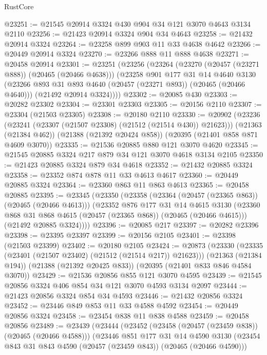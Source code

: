 \begin{lexlean}{RustCore}
\begin{coremodule}
@23251 := @21545 @20914 @3324 @430 @904 @34 @121 @3070 @4643 @3134 @2110
@23256 := @21423 @20914 @3324 @904 @34 @4643
@23258 := @21432 @20914 @3324
@23264 := @23258 @899 @903 @11 @33 @4638 @4642
@23266 := @20449 @20914 @3324
@23270 := @23266 @888 @11 @888 @4638
@23271 := @20458 @20914
@23301 := @23251
    (@23256
      (@23264
        (@23270 (@20457 (@23271 @888)) (@20465 (@20466 @4638)))
        (@23258
          @901
          @177
          @31
          @14
          @4640
          @3130
          (@23266 @893 @31 @893 @4640 (@20457 (@23271 @893)) (@20465 (@20466 @4640)))
          (@21492 @20914 @3324))))
@23302 := @20085 @430
@23303 := @20282 @23302
@23304 := @23301 @23303
@23305 := @20156 @2110
@23307 := @23304 (@21503 @23305)
@23308 := @20180 @2110
@23330 := @20902
    (@23236 (@23241 (@23307 (@21507 @23308) (@21512 (@21514 @430)) @21623)))
    (@21363 (@21384 @462))
    (@21388 (@21392 @20424 @858))
    (@20395 (@21401 @858 @871 @4609 @3070))
@23335 := @21536 @20885 @880 @121 @3070 @4620
@23345 := @21545 @20885 @3324 @217 @879 @34 @121 @3070 @4618 @3134 @2105
@23350 := @21423 @20885 @3324 @879 @34 @4618
@23352 := @21432 @20885 @3324
@23358 := @23352 @874 @878 @11 @33 @4613 @4617
@23360 := @20449 @20885 @3324
@23364 := @23360 @863 @11 @863 @4613
@23365 := @20458 @20885
@23395 := @23345
    (@23350
      (@23358
        (@23364 (@20457 (@23365 @863)) (@20465 (@20466 @4613)))
        (@23352
          @876
          @177
          @31
          @14
          @4615
          @3130
          (@23360 @868 @31 @868 @4615 (@20457 (@23365 @868)) (@20465 (@20466 @4615)))
          (@21492 @20885 @3324))))
@23396 := @20085 @217
@23397 := @20282 @23396
@23398 := @23395 @23397
@23399 := @20156 @2105
@23401 := @23398 (@21503 @23399)
@23402 := @20180 @2105
@23424 := @20873
    (@23330 (@23335 (@23401 (@21507 @23402) (@21512 (@21514 @217)) @21623)))
    (@21363 (@21384 @194))
    (@21388 (@21392 @20425 @833))
    (@20395 (@21401 @833 @846 @4584 @3070))
@23429 := @21536 @20856 @855 @121 @3070 @4595
@23439 := @21545 @20856 @3324 @406 @854 @34 @121 @3070 @4593 @3134 @2097
@23444 := @21423 @20856 @3324 @854 @34 @4593
@23446 := @21432 @20856 @3324
@23452 := @23446 @849 @853 @11 @33 @4588 @4592
@23454 := @20449 @20856 @3324
@23458 := @23454 @838 @11 @838 @4588
@23459 := @20458 @20856
@23489 := @23439
    (@23444
      (@23452
        (@23458 (@20457 (@23459 @838)) (@20465 (@20466 @4588)))
        (@23446
          @851
          @177
          @31
          @14
          @4590
          @3130
          (@23454 @843 @31 @843 @4590 (@20457 (@23459 @843)) (@20465 (@20466 @4590)))

\end{coremodule}
\end{lexlean}
